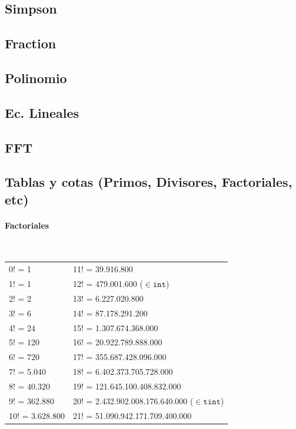 \subsection{Simpson}
\subsection{Fraction}
\subsection{Polinomio}
\subsection{Ec. Lineales}
\subsection{FFT}
\subsection{Tablas y cotas (Primos, Divisores, Factoriales, etc)}
\paragraph{Factoriales} \ \\
\begin{tabular}{l|l}
0! =	1             & 11! = 39.916.800  \\
1! =	1             & 12! =	479.001.600	($\in \mathtt{int}$)\\
2! =	2             & 13! =	6.227.020.800	\\
3! =	6             & 14! =	87.178.291.200	\\
4! =	24            & 15! =	1.307.674.368.000	\\
5! =	120   			  & 16! =	20.922.789.888.000	\\
6! =	720           & 17! =	355.687.428.096.000	\\
7! =	5.040	        & 18! =	6.402.373.705.728.000	\\
8! =	40.320	      & 19! =	121.645.100.408.832.000	\\
9! =	362.880       & 20! =	2.432.902.008.176.640.000	($\in \mathtt{tint}$) \\
10! =	3.628.800     & 21! =	51.090.942.171.709.400.000
\end{tabular}
 
